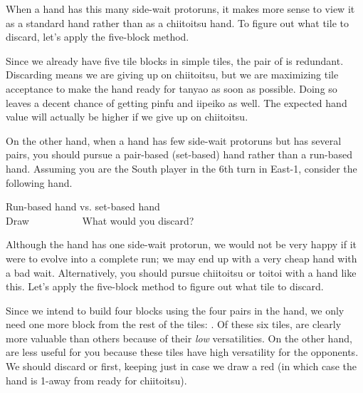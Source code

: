 \bigskip
When a hand has this many side-wait protoruns, it makes more sense to view it as a standard hand rather than as a {\jap chiitoitsu} hand. To figure out what tile to discard, let's apply the five-block method. 

\emj

\bigskip
Since we already have five tile blocks in simple tiles, the pair of {\LARGE\bei} is redundant. Discarding {\LARGE\bei} means we are giving up on {\jap chiitoitsu}, but we are maximizing tile acceptance to make the hand ready for {\jap tanyao} as soon as possible. Doing so leaves a decent chance of getting {\jap pinfu} and {\jap iipeiko} as well. The expected hand value will actually be higher if we give up on {\jap chiitoitsu}.

\bigskip
On the other hand, when a hand has few side-wait protoruns but has several pairs, you should pursue a pair-based (set-based) hand rather than a run-based hand. Assuming you are the South player in the 6th turn in East-1, consider the following hand. 

\bigskip
\begin{itembox}[r]{Run-based hand vs. set-based hand}
\bp
{}\dong\nan\bai~\bai\\
\hfill\footnotesize{Draw~~~~~~~~~~}
\ep
\vspace{-17pt}What would you discard? \vspace{-5pt}
\end{itembox}

\bigskip
Although the hand has one side-wait protorun, we would not be very happy if it were to evolve into a complete run; we may end up with a very cheap hand with a bad wait. Alternatively, you should pursue {\jap chiitoitsu} or {\jap toitoi} with a hand like this. Let's apply the five-block method to figure out what tile to discard.

{}\emj

\bigskip
Since we intend to build four blocks using the four pairs in the hand, we only need one more block from the rest of the tiles: {\LARGE{}\dong\nan}. Of these six tiles, {\LARGE\dong\nan{}} are clearly more valuable than others because of their \emph{low} versatilities. On the other hand, {\LARGE{}} are less useful for you because these tiles have high versatility for the opponents. We should discard {\LARGE{}} or {\LARGE{}} first, keeping {\LARGE{}} just in case we draw a red {\LARGE\rfd} (in which case the hand is 1-away from ready for {\jap chiitoitsu}).





